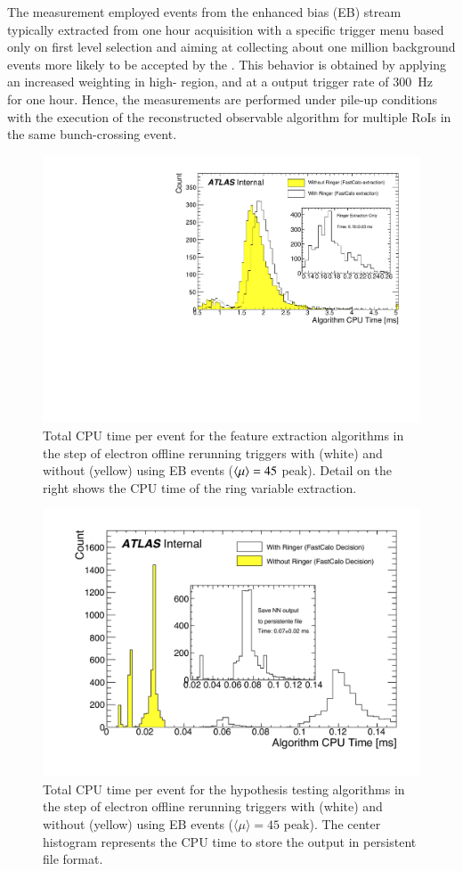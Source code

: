The measurement employed events from the enhanced bias (EB)
stream~\cite{eb_description} typically extracted from one hour acquisition with
a specific trigger menu based only on first level selection and aiming at
collecting about one million background events more likely to be accepted by the
\hlt{}. This behavior is obtained by applying an increased weighting in high-\pt{} region,
and at a output trigger rate of \SI{300}{\hertz}~\cite{eb_specifications} for one hour. Hence, the
measurements are performed under pile-up conditions with the execution of the
reconstructed observable algorithm for multiple RoIs in the same bunch-crossing event.


\begin{figure}[h!tb]
	\includegraphics[width=.7\textwidth]{sections/05_analysis/figures/EgammaFex_TotalTime}
	\centering
	\caption{\label{fig:fastcalo_fex_time}
		Total CPU time per event for the feature extraction algorithms in the \fastcalo step of electron offline rerunning triggers with (white) and without (yellow) \rnn{} using EB events ($\langle \mu \rangle=45$ peak). Detail on the right shows the CPU time of the ring variable extraction.  
	}
\end{figure}

\begin{figure}[h!tb]
	\includegraphics[width=.7\textwidth]{sections/05_analysis/figures/EgammaHypo_TotalTime.pdf}
	\centering
	\caption{\label{fig:fastcalo_hypo_time}
		Total CPU time per event for the hypothesis testing algorithms
		in the \fastcalo step of electron offline rerunning triggers with (white) and without (yellow) \rnn{} using EB events ($\langle \mu \rangle = 45$ peak). The center histogram represents the CPU time to store the \rnn{} output in persistent file format.}
\end{figure}

